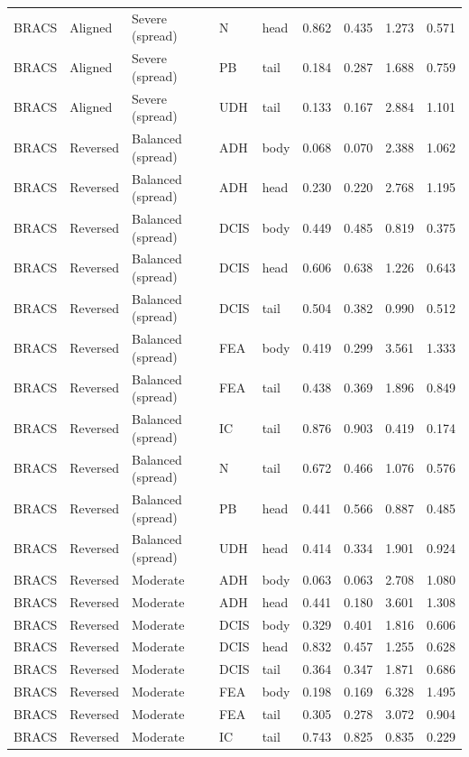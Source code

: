 \begin{longtable}{lllllrrrr}
BRACS & Aligned & Severe (spread) & N & head & 0.862 & 0.435 & 1.273 & 0.571 \\
BRACS & Aligned & Severe (spread) & PB & tail & 0.184 & 0.287 & 1.688 & 0.759 \\
BRACS & Aligned & Severe (spread) & UDH & tail & 0.133 & 0.167 & 2.884 & 1.101 \\
BRACS & Reversed & Balanced (spread) & ADH & body & 0.068 & 0.070 & 2.388 & 1.062 \\
BRACS & Reversed & Balanced (spread) & ADH & head & 0.230 & 0.220 & 2.768 & 1.195 \\
BRACS & Reversed & Balanced (spread) & DCIS & body & 0.449 & 0.485 & 0.819 & 0.375 \\
BRACS & Reversed & Balanced (spread) & DCIS & head & 0.606 & 0.638 & 1.226 & 0.643 \\
BRACS & Reversed & Balanced (spread) & DCIS & tail & 0.504 & 0.382 & 0.990 & 0.512 \\
BRACS & Reversed & Balanced (spread) & FEA & body & 0.419 & 0.299 & 3.561 & 1.333 \\
BRACS & Reversed & Balanced (spread) & FEA & tail & 0.438 & 0.369 & 1.896 & 0.849 \\
BRACS & Reversed & Balanced (spread) & IC & tail & 0.876 & 0.903 & 0.419 & 0.174 \\
BRACS & Reversed & Balanced (spread) & N & tail & 0.672 & 0.466 & 1.076 & 0.576 \\
BRACS & Reversed & Balanced (spread) & PB & head & 0.441 & 0.566 & 0.887 & 0.485 \\
BRACS & Reversed & Balanced (spread) & UDH & head & 0.414 & 0.334 & 1.901 & 0.924 \\
BRACS & Reversed & Moderate & ADH & body & 0.063 & 0.063 & 2.708 & 1.080 \\
BRACS & Reversed & Moderate & ADH & head & 0.441 & 0.180 & 3.601 & 1.308 \\
BRACS & Reversed & Moderate & DCIS & body & 0.329 & 0.401 & 1.816 & 0.606 \\
BRACS & Reversed & Moderate & DCIS & head & 0.832 & 0.457 & 1.255 & 0.628 \\
BRACS & Reversed & Moderate & DCIS & tail & 0.364 & 0.347 & 1.871 & 0.686 \\
BRACS & Reversed & Moderate & FEA & body & 0.198 & 0.169 & 6.328 & 1.495 \\
BRACS & Reversed & Moderate & FEA & tail & 0.305 & 0.278 & 3.072 & 0.904 \\
BRACS & Reversed & Moderate & IC & tail & 0.743 & 0.825 & 0.835 & 0.229 \\

\end{longtable}
